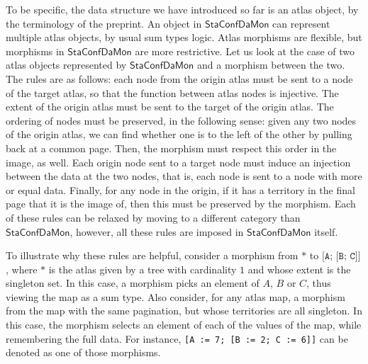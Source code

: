 \documentclass[11pt]{article}
\newcommand{\code}[1]{\texttt{#1}}
\newcommand{\StaConfDaMon}{\mathsf{StaConfDaMon}}
\begin{document}
To be specific, the data structure we have introduced so far is an atlas
object, by the terminology of the preprint. An object in
\(\StaConfDaMon\) can represent multiple atlas objects, by usual sum types
logic. Atlas morphisms are flexible, but morphisms in \(\StaConfDaMon\) are
more restrictive. Let us look at the case of two atlas objects represented
by \(\StaConfDaMon\) and a morphism between the two. The rules are as follows:
each node from the origin atlas must be sent to a node of the target atlas,
so that the function between atlas nodes is injective. The extent of the
origin atlas must be sent to the target of the origin atlas. The ordering of
nodes must be preserved, in the following sense: given any two nodes of the
origin atlas, we can find whether one is to the left of the other by pulling
back at a common page. Then, the morphism must respect this order in the
image, as well. Each origin node sent to a target node must induce an
injection between the data at the two nodes, that is, each node is sent to a
node with more or equal data. Finally, for any node in the origin, if it has
a territory in the final page that it is the image of, then this must be
preserved by the morphism. Each of these rules can be relaxed by moving to a
different category than \(\StaConfDaMon\), however, all these rules are
imposed in \(\StaConfDaMon\) itself.

    To illustrate why these rules are helpful, consider a morphism
from \(\code{*}\) to \(\code{[A; [B; C]]}\), where \(\code{*}\) is the
atlas given by a tree with cardinality \(1\) and whose extent is the
singleton set. In this case, a morphism picks an element of \(A\), \(B\) or
\(C\), thus viewing the map as a sum type. Also consider, for any atlas map,
a morphism from the map with the same pagination, but whose territories are
all singleton. In this case, the morphism selects an element of each of the
values of the map, while remembering the full data. For instance,
    \code{[A := 7;\allowbreak\ [B := 2;\allowbreak\ C := 6]]} can be
    denoted as one of those
morphisms.
\end{document}
